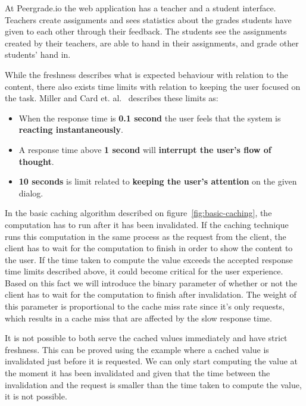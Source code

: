 \begin{example}
\label{example:peergrade-split-interface}
At Peergrade.io the web application has a teacher and a student interface. Teachers create assignments and sees statistics about the grades students have given to each other through their feedback. The students see the assignments created by their teachers, are able to hand in their assignments, and grade other students' hand in.
\end{example}



While the freshness describes what is expected behaviour with relation to the content, there also exists time limits with relation to keeping the user focused on the task. Miller and Card et. al.~\cite{paper:miller-response-time-limit, paper:card-response-time-limit} describes these limits as:

\begin{itemize}
  \item When the response time is \textbf{0.1 second} the user feels that the system is \textbf{reacting instantaneously}.
  \item A response time above \textbf{1 second} will \textbf{interrupt the user's flow of thought}.
  \item \textbf{10 seconds} is limit related to \textbf{keeping the user's attention} on the given dialog.
\end{itemize}

In the basic caching algorithm described on figure~\ref{fig:basic-caching}, the computation has to run after it has been invalidated. If the caching technique runs this computation in the same process as the request from the client, the client has to wait for the computation to finish in order to show the content to the user. If the time taken to compute the value exceeds the accepted response time limits described above, it could become critical for the user experience. Based on this fact we will introduce the binary parameter of whether or not the client has to wait for the computation to finish after invalidation. The weight of this parameter is proportional to the cache miss rate since it's only requests, which results in a cache miss that are affected by the slow response time.



It is not possible to both serve the cached values immediately and have strict freshness. This can be proved using the example where a cached value is invalidated just before it is requested. We can only start computing the value at the moment it has been invalidated and given that the time between the invalidation and the request is smaller than the time taken to compute the value, it is not possible.

